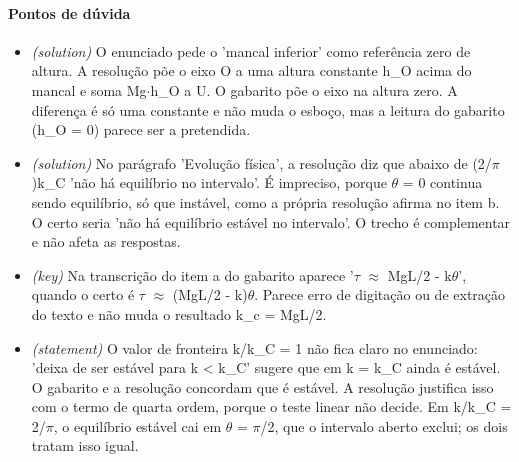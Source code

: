 \documentclass{article}%
\begin{document}
\paragraph{Pontos de dúvida}%
\begin{itemize}%
\item%
\textit{(solution)} O enunciado pede o 'mancal inferior' como referência zero de altura. A resolução põe o eixo O a uma altura constante h\_O acima do mancal e soma Mg$\cdot$h\_O a U. O gabarito põe o eixo na altura zero. A diferença é só uma constante e não muda o esboço, mas a leitura do gabarito (h\_O = 0) parece ser a pretendida.%
\item%
\textit{(solution)} No parágrafo 'Evolução física', a resolução diz que abaixo de (2/$\pi$)k\_C 'não há equilíbrio no intervalo'. É impreciso, porque $\theta$ = 0 continua sendo equilíbrio, só que instável, como a própria resolução afirma no item b. O certo seria 'não há equilíbrio estável no intervalo'. O trecho é complementar e não afeta as respostas.%
\item%
\textit{(key)} Na transcrição do item a do gabarito aparece '$\tau$ $\approx$ MgL/2 - k$\theta$', quando o certo é $\tau$ $\approx$ (MgL/2 - k)$\theta$. Parece erro de digitação ou de extração do texto e não muda o resultado k\_c = MgL/2.%
\item%
\textit{(statement)} O valor de fronteira k/k\_C = 1 não fica claro no enunciado: 'deixa de ser estável para k < k\_C' sugere que em k = k\_C ainda é estável. O gabarito e a resolução concordam que é estável. A resolução justifica isso com o termo de quarta ordem, porque o teste linear não decide. Em k/k\_C = 2/$\pi$, o equilíbrio estável cai em $\theta$ = $\pi$/2, que o intervalo aberto exclui; os dois tratam isso igual.%
\end{itemize}%
\end{document}
